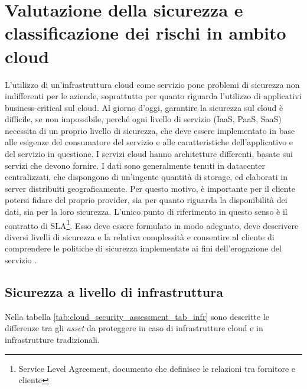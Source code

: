 \documentclass[../main.tex]{subfiles}
\begin{document}
\section{Valutazione della sicurezza e classificazione dei rischi in ambito cloud}
L'utilizzo di un'infrastruttura cloud come servizio pone problemi di sicurezza non indifferenti per le aziende, soprattutto per quanto riguarda l'utilizzo di applicativi business-critical sul cloud.
Al giorno d'oggi, garantire la sicurezza sul cloud è difficile, se non impossibile, perché ogni livello di servizio (IaaS, PaaS, SaaS) necessita di un proprio livello di sicurezza, che deve essere implementato in base alle esigenze del consumatore del servizio e alle caratteristiche dell'applicativo e del servizio in questione.
I servizi cloud hanno architetture differenti, basate sui servizi che devono fornire. I dati sono generalmente tenuti in datacenter centralizzati, che dispongono di un'ingente quantità di storage, ed elaborati in server distribuiti geograficamente. Per questo motivo, è importante per il cliente potersi fidare del proprio provider, sia per quanto riguarda la disponibilità dei dati, sia per la loro sicurezza.
L'unico punto di riferimento in questo senso è il contratto di SLA\footnote{Service Level Agreement, documento che definisce le relazioni tra fornitore e cliente}.
Esso deve essere formulato in modo adeguato, deve descrivere diversi livelli di sicurezza e la relativa complessità e consentire al cliente di comprendere le politiche di sicurezza implementate ai fini dell'erogazione del servizio \cite{CloudSecurityIssues}.




\subsection{Sicurezza a livello di infrastruttura}

Nella tabella \ref{tab:cloud_security_assessment_tab_infr} sono descritte le differenze tra gli \textit{asset} da proteggere in caso di infrastrutture cloud e in infrastrutture tradizionali.
\end{document}
